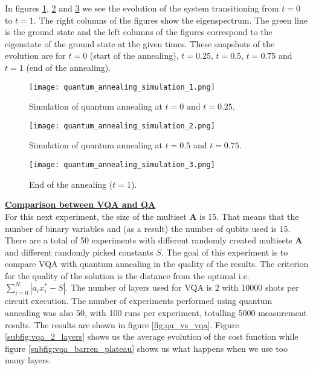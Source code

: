 \documentclass[12pt,a4paper]{report}
\begin{document}
\noindent
In figures \ref{fig:quantum_annealing_simulation_1}, \ref{fig:quantum_annealing_simulation_2} and \ref{fig:quantum_annealing_simulation_3} we see the evolution of the system transitioning from \( t = 0 \) to \( t = 1 \). The right columns of the figures show the eigenspectrum. The green line is the ground state and the left columns of the figures correspond to the eigenstate of the ground state at the given times. These snapshots of the evolution are for \( t = 0 \) (start of the annealing), \( t = 0.25 \), \( t = 0.5 \), \( t = 0.75 \) and \( t = 1 \) (end of the annealing).



\begin{figure}[h]
  \centering
  \texttt{[image: quantum\_annealing\_simulation\_1.png]} 
  \caption{Simulation of quantum annealing at \(t=0\) and \(t=0.25\).}
  \label{fig:quantum_annealing_simulation_1}
\end{figure}

\newpage

\begin{figure}[h]
  \centering
  \texttt{[image: quantum\_annealing\_simulation\_2.png]} 
  \caption{Simulation of quantum annealing at \(t=0.5\) and \(t=0.75\).}
  \label{fig:quantum_annealing_simulation_2}
\end{figure}

\begin{figure}[H]
  \centering
  \texttt{[image: quantum\_annealing\_simulation\_3.png]} 
  \caption{End of the annealing (\(t=1\)).}
  \label{fig:quantum_annealing_simulation_3}
\end{figure}

\newpage

\noindent
\textbf{\underline{Comparison between VQA and QA}}
\\

\noindent
For this next experiment, the size of the multiset \( \mathbf{A} \) is 15. That means that the number of binary variables and (as a result) the number of qubits used is 15. There are a total of 50 experiments with different randomly created multisets \( \mathbf{A} \) and different randomly picked constants \( S \). The goal of this experiment is to compare VQA with quantum annealing in the quality of the results. The criterion for the quality of the solution is the distance from the optimal i.e. \(\sum_{i=0}^{N} |a_i x_i^* - S |\). The number of layers used for VQA is 2 with 10000 shots per circuit execution. The number of experiments performed using quantum annealing was also 50, with 100 runs per experiment, totalling 5000 measurement results. The results are shown in figure \ref{fig:qa_vs_vqa}. Figure \ref{subfig:vqa_2_layers} shows us the average evolution of the cost function while figure \ref{subfig:vqa_barren_plateau} shows us what happens when we use too many layers.
\end{document}
